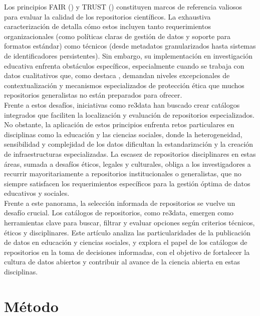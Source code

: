 \documentclass[runningheads]{llncs}
\begin{document}
Los principios FAIR (\cite{wilkinson2016}) y TRUST (\cite{Lin2020TRUST}) constituyen marcos de referencia valiosos para evaluar la calidad de los repositorios científicos. La exhaustiva caracterización de \cite{behnke_2020_5361952} detalla cómo estos incluyen tanto requerimientos organizacionales (como políticas claras de gestión de datos y soporte para formatos estándar) como técnicos (desde metadatos granularizados hasta sistemas de identificadores persistentes). Sin embargo, su implementación en investigación educativa enfrenta obstáculos específicos, especialmente cuando se trabaja con datos cualitativos que, como  destaca \cite{antonio}, demandan niveles excepcionales de contextualización y mecanismos especializados de protección ética que muchos repositorios generalistas no están preparados para ofrecer.\\

Frente a estos desafíos, iniciativas como re3data \cite{pampel2013} han buscado crear catálogos integrados que faciliten la localización y evaluación de repositorios especializados.\\

No obstante, la aplicación de estos principios enfrenta retos particulares en disciplinas como la educación y las ciencias sociales, donde la heterogeneidad, sensibilidad y complejidad de los datos dificultan la estandarización y la creación de infraestructuras especializadas. La escasez de repositorios disciplinares en estas áreas, sumada a desafíos éticos, legales y culturales, obliga a los investigadores a recurrir mayoritariamente a repositorios institucionales o generalistas, que no siempre satisfacen los requerimientos específicos para la gestión óptima de datos educativos y sociales.\\

Frente a este panorama, la selección informada de repositorios se vuelve un desafío crucial. Los catálogos de repositorios, como re3data, emergen como herramientas clave para buscar, filtrar y evaluar opciones según criterios técnicos, éticos y disciplinares. Este artículo analiza las particularidades de la publicación de datos en educación y ciencias sociales, y explora el papel de los catálogos de repositorios en la toma de decisiones informadas, con el objetivo de fortalecer la cultura de datos abiertos y contribuir al avance de la ciencia abierta en estas disciplinas.\\

\section{Método}
\end{document}
